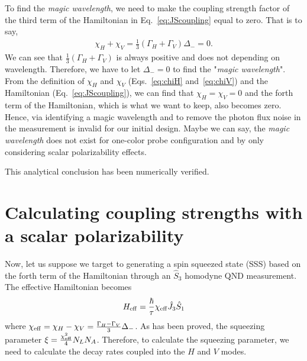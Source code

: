 To find the \emph{magic wavelength}, we need to make the coupling strength factor of the third term of the Hamiltonian in Eq.~\eqref{eq:JScoupling} equal to zero. That is to say,
\begin{align}
\chi_H+\chi_V=\frac{1}{3}\left(\Gamma_H + \Gamma_V \right)\Delta_- = 0.
\end{align}
We can see that $ \frac{1}{3}\left(\Gamma_H + \Gamma_V \right) $ is always positive and does not 
depending on wavelength. Therefore, we have to let $ \Delta_-=0 $ to find the "\textit{magic 
wavelength}". From the definition of $ \chi_H $ and $ \chi_V $ 
(Eqs.~\eqref{eq:chiH} and~\eqref{eq:chiV}) and the Hamiltonian (Eq.~\eqref{eq:JScoupling}), we can 
find that $ \chi_H=\chi_V=0 $ and the forth term of the Hamiltonian, which is what we want to keep, also 
becomes zero. Hence, via identifying a magic wavelength and to remove the photon flux noise in the 
measurement is invalid for our initial design. Maybe we can say, the \emph{magic wavelength} does not 
exist for one-color probe configuration and by only considering scalar polarizability effects. 

This analytical conclusion has been numerically verified. 

\section{Calculating coupling strengths with a scalar polarizability}
Now, let us suppose we target to generating a spin squeezed state (SSS) based on the forth term of the Hamiltonian through an $ \hat{S}_3 $ homodyne QND measurement. The effective Hamiltonian becomes
\begin{align}
	H_{\rm eff} = \frac{\hbar}{\tau} \chi_{\rm eff} \hat{J}_3 \hat{S}_1
\end{align}
where $\chi_{\rm eff} = \chi_{H} - \chi_{V}=\frac{\Gamma_H-\Gamma_V}{3}\Delta_-$. As has been proved, the squeezing parameter $ \xi =\frac{\chi_{\rm eff}^2 }{4}N_LN_A $. Therefore, to calculate the squeezing parameter, we need to calculate the decay rates coupled into the $ H $ and $ V $ modes. 


